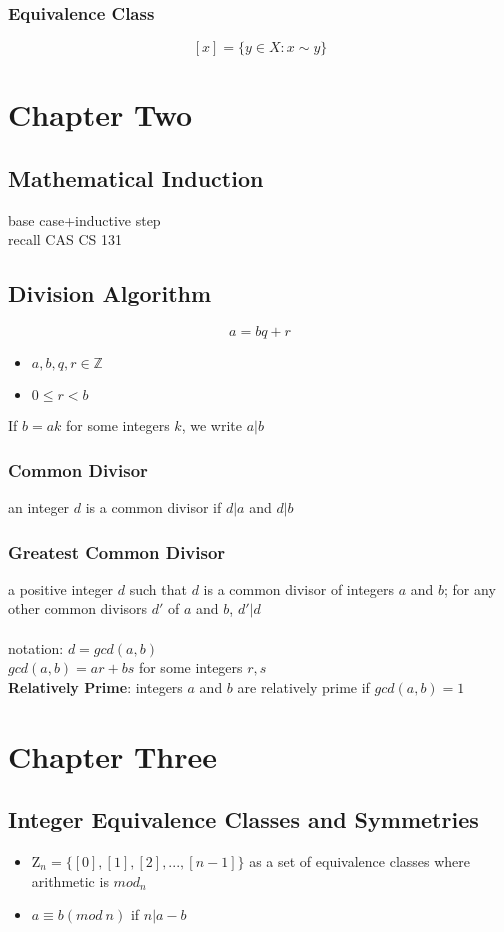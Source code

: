 \documentclass{article}
\begin{document}
\subsubsection{Equivalence Class}
$$[x]=\{y\in X: x\sim y\}$$
\section{Chapter Two}
\subsection{Mathematical Induction}
base case+inductive step\\
recall CAS CS 131
\subsection{Division Algorithm}
$$a=bq+r$$
\begin{itemize}
    \item $a,b,q,r \in \mathbb{Z}$
    \item $0\leq r<b$
\end{itemize}
If $b=ak$ for some integers $k$, we write $a|b$
\subsubsection{Common Divisor}
an integer $d$ is a common divisor if $d|a$ and $d|b$
\subsubsection{Greatest Common Divisor}
a positive integer $d$ such that $d$ is a common divisor of integers $a$ and $b$; for any other common divisors $d'$ of $a$ and $b$, $d'|d$\\\\
notation: $d=gcd(a,b)$\\
$gcd(a,b)=ar+bs$ for some integers $r,s$\\

\textbf{Relatively Prime}: integers $a$ and $b$ are relatively prime if $gcd(a,b)=1$\\

\section{Chapter Three}
\subsection{Integer Equivalence Classes and Symmetries}
\begin{itemize}
    \item $\mathrm{Z}_n=\{[0],[1],[2],...,[n-1]\}$ as a set of equivalence classes where arithmetic is $mod_n$
    \item $a\equiv b(mod \: n)$ if $n|a-b$
\end{itemize}
\end{document}
